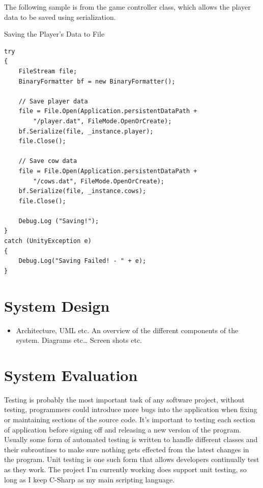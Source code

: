 The following sample is from the game controller class, which allows the player data to be saved using serialization. 

Saving the Player's Data to File
\begin{verbatim}
try
{
	FileStream file;
	BinaryFormatter bf = new BinaryFormatter();
	
	// Save player data
	file = File.Open(Application.persistentDataPath + 
		"/player.dat", FileMode.OpenOrCreate);
	bf.Serialize(file, _instance.player);
	file.Close();
	
	// Save cow data
	file = File.Open(Application.persistentDataPath + 
		"/cows.dat", FileMode.OpenOrCreate);
	bf.Serialize(file, _instance.cows);
	file.Close();
	
	Debug.Log ("Saving!");
}
catch (UnityException e)
{
	Debug.Log("Saving Failed! - " + e);
}
\end{verbatim}

\chapter{System Design}

\begin{itemize}
\item Architecture, UML etc. An overview of the different components of the system. Diagrams etc… Screen shots etc.
\end{itemize}

\chapter{System Evaluation}
Testing is probably the most important task of any software project, without testing, programmers could introduce more bugs into the application when fixing or maintaining sections of the source code. It's important to testing each section of application before signing off and releasing a new version of the program. Usually some form of automated testing is written to handle different classes and their subroutines to make sure nothing gets effected from the latest changes in the program. Unit testing is one such form that allows developers continually test as they work. The project I'm currently working does support unit testing, so long as I keep C-Sharp as my main scripting language.
